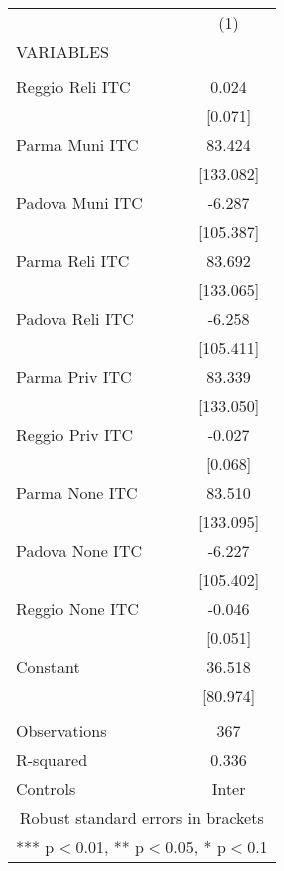 \begin{tabular}{lc} \hline
 & (1) \\
VARIABLES &  \\ \hline
 &  \\
Reggio Reli ITC & 0.024 \\
 & [0.071] \\
Parma Muni ITC & 83.424 \\
 & [133.082] \\
Padova Muni ITC & -6.287 \\
 & [105.387] \\
Parma Reli ITC & 83.692 \\
 & [133.065] \\
Padova Reli ITC & -6.258 \\
 & [105.411] \\
Parma Priv ITC & 83.339 \\
 & [133.050] \\
Reggio Priv ITC & -0.027 \\
 & [0.068] \\
Parma None ITC & 83.510 \\
 & [133.095] \\
Padova None ITC & -6.227 \\
 & [105.402] \\
Reggio None ITC & -0.046 \\
 & [0.051] \\
Constant & 36.518 \\
 & [80.974] \\
 &  \\
Observations & 367 \\
R-squared & 0.336 \\
 Controls & Inter \\ \hline
\multicolumn{2}{c}{ Robust standard errors in brackets} \\
\multicolumn{2}{c}{ *** p$<$0.01, ** p$<$0.05, * p$<$0.1} \\
\end{tabular}
